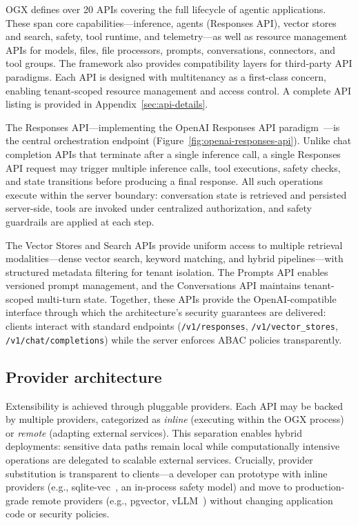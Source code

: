 \documentclass[sigconf]{acmart}
\begin{document}
OGX defines over 20 APIs covering the full lifecycle of agentic applications. These span core capabilities---inference, agents (Responses API), vector stores and search, safety, tool runtime, and telemetry---as well as resource management APIs for models, files, file processors, prompts, conversations, connectors, and tool groups. The framework also provides compatibility layers for third-party API paradigms. Each API is designed with multitenancy as a first-class concern, enabling tenant-scoped resource management and access control. A complete API listing is provided in Appendix~\ref{sec:api-details}.

The Responses API---implementing the OpenAI Responses API paradigm~\cite{openaiResponsesAPI}---is the central orchestration endpoint (Figure~\ref{fig:openai-responses-api}). Unlike chat completion APIs that terminate after a single inference call, a single Responses API request may trigger multiple inference calls, tool executions, safety checks, and state transitions before producing a final response. All such operations execute within the server boundary: conversation state is retrieved and persisted server-side, tools are invoked under centralized authorization, and safety guardrails are applied at each step.

The Vector Stores and Search APIs provide uniform access to multiple retrieval modalities---dense vector search, keyword matching, and hybrid pipelines---with structured metadata filtering for tenant isolation. The Prompts API enables versioned prompt management, and the Conversations API maintains tenant-scoped multi-turn state. Together, these APIs provide the OpenAI-compatible interface through which the architecture's security guarantees are delivered: clients interact with standard endpoints (\texttt{/v1/responses}, \texttt{/v1/vector\_stores}, \texttt{/v1/chat/completions}) while the server enforces ABAC policies transparently.

\subsection{Provider architecture}
\label{sec:providers}

Extensibility is achieved through pluggable providers. Each API may be backed by multiple providers, categorized as \emph{inline} (executing within the OGX process) or \emph{remote} (adapting external services). This separation enables hybrid deployments: sensitive data paths remain local while computationally intensive operations are delegated to scalable external services. Crucially, provider substitution is transparent to clients---a developer can prototype with inline providers (e.g., sqlite-vec~\cite{sqlitevec}, an in-process safety model) and move to production-grade remote providers (e.g., pgvector, vLLM~\cite{kwon2023vllm}) without changing application code or security policies.
\end{document}
